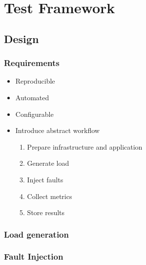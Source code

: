 \chapter{Test Framework}

\section{Design}

\subsection{Requirements}

\begin{itemize}
	\item Reproducible
	\item Automated
	\item Configurable
	\item Introduce abstract workflow \begin{enumerate}
		\item Prepare infrastructure and application
		\item Generate load
		\item Inject faults
		\item Collect metrics
		\item Store results
	\end{enumerate}
\end{itemize}


\subsection{Load generation}


\subsection{Fault Injection}


